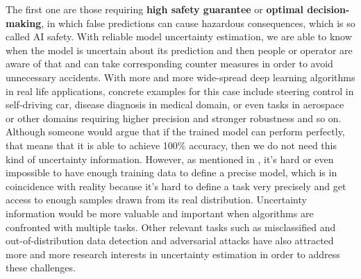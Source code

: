 The first one are those requiring \textbf{high safety guarantee} or \textbf{optimal decision-making}, in which false predictions can cause hazardous consequences, which is so called AI safety\cite{amodei2016concrete}. With reliable model uncertainty estimation, we are able to know when the model is uncertain about its prediction and then people or operator are aware of that and can take corresponding counter measures in order to avoid unnecessary accidents. With more and more wide-spread deep learning algorithms in real life applications, concrete examples for this case include steering control in self-driving car\cite{mcallister2017concrete}, disease diagnosis in medical domain\cite{leibig2017leveraging}, or even tasks in aerospace or other domains requiring higher precision and stronger robustness and so on. Although someone would argue that if the trained model can perform perfectly, that means that it is able to achieve 100\% accuracy, then we do not need this kind of uncertainty information. However, as mentioned in \cite{denker1991transforming}, it's hard or even impossible to have enough training data to define a precise model, which is in coincidence with reality because it's hard to define a task very precisely and get access to enough samples drawn from its real distribution. Uncertainty information would be more valuable and important when algorithms are confronted with multiple tasks\cite{kendall2017multi}. Other relevant tasks such as misclassified and out-of-distribution data detection\cite{hendrycks2016baseline} and adversarial attacks \cite{kurakin2016adversarial}\cite{feinman2017detecting} have also attracted more and more research interests in uncertainty estimation in order to address these challenges.

